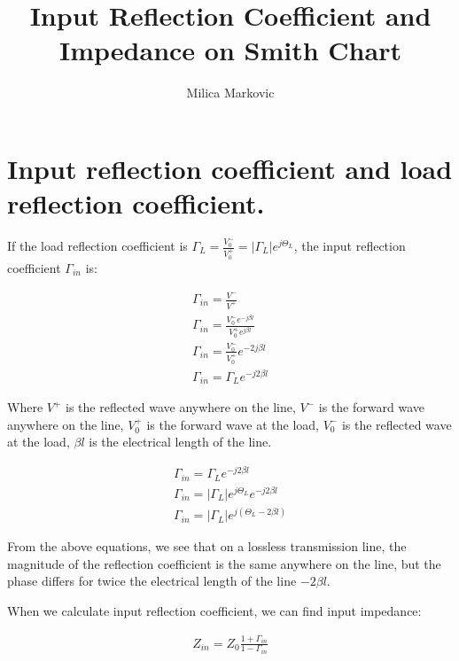 \documentclass{ximera}
\title{Input Reflection Coefficient and Impedance on Smith Chart}
\author{Milica Markovic}
\begin{document}
  
\begin{abstract}  

\end{abstract}  
\maketitle    






\section{Input reflection coefficient and load reflection coefficient.}


If the load reflection coefficient is $\Gamma_L=\frac{V_0^-}{V_0^+}=|\Gamma_L| e^{j \Theta_{L}}$, 
the input reflection coefficient $\Gamma_{in}$ is: 

\begin{eqnarray}
\Gamma_{in}=\frac{V^-}{V^+} \\
\Gamma_{in}= \frac{V_0^- e^{-j\beta l}}{V_0^+ e^{j\beta l}} \\
\Gamma_{in}= \frac{V_0^-}{V_0^+} e^{-2j \beta l} \\
\Gamma_{in}= \Gamma_L e^{-j2 \beta l}
\end{eqnarray}

Where $V^+$ is the reflected wave anywhere on the line, $V^-$ is the forward wave anywhere on the line, $V_0^+$ is the forward wave at the load, $V_0^-$ is the reflected wave at the load, $\beta l$ is the electrical length of the line.

\begin{eqnarray}
\Gamma_{in}=\Gamma_L e^{-j2 \beta l} \\
\Gamma_{in} = |\Gamma_L| e^{j \Theta_{L}} e^{-j2 \beta l} \\
\Gamma_{in} = |\Gamma_L| e^{j(\Theta_{L} -2 \beta l) } 
\end{eqnarray}

From the above equations, we see that on a lossless transmission line, the magnitude of the reflection coefficient is the same anywhere on the line, but the phase differs for twice the electrical length of the line $-2 \beta l$.

When we calculate input reflection coefficient, we can find input impedance:

\begin{eqnarray}
Z_{in}=Z_0 \frac{1+\Gamma_{in}}{1-\Gamma_{in}}
\end{eqnarray}
\end{document}
